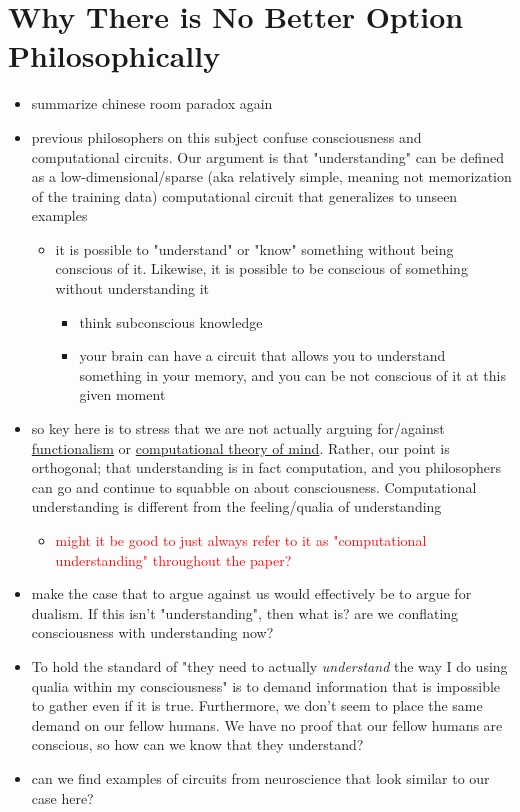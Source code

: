 \documentclass{article}
\begin{document}
\section{Why There is No Better Option Philosophically}
\label{sec:phil}

\begin{itemize}
    \item summarize chinese room paradox again
    \item previous philosophers on this subject confuse consciousness and computational circuits. Our argument is that "understanding" can be defined as a low-dimensional/sparse (aka relatively simple, meaning not memorization of the training data) computational circuit that generalizes to unseen examples
    \begin{itemize}
        \item it is possible to "understand" or "know" something without being conscious of it. Likewise, it is possible to be conscious of something without understanding it
        \begin{itemize}
            \item think subconscious knowledge
            \item your brain can have a circuit that allows you to understand something in your memory, and you can be not conscious of it at this given moment
        \end{itemize}
    \end{itemize}
    \item so key here is to stress that we are not actually arguing for/against \href{https://en.wikipedia.org/wiki/Functionalism_(philosophy_of_mind)}{functionalism} or \href{https://en.wikipedia.org/wiki/Computational_theory_of_mind}{computational theory of mind}. Rather, our point is orthogonal; that understanding is in fact computation, and you philosophers can go and continue to squabble on about consciousness. Computational understanding is different from the feeling/qualia of understanding
    \begin{itemize}
        \item \textcolor{red}{might it be good to just always refer to it as "computational understanding" throughout the paper?}
    \end{itemize}
    \item make the case that to argue against us would effectively be to argue for dualism. If this isn't "understanding", then what is? are we conflating consciousness with understanding now?
    \item To hold the standard of "they need to actually \textit{understand} the way I do using qualia within my consciousness" is to demand information that is impossible to gather even if it is true. Furthermore, we don't seem to place the same demand on our fellow humans. We have no proof that our fellow humans are conscious, so how can we know that they understand?
    \item can we find examples of circuits from neuroscience that look similar to our case here?
\end{itemize}
\end{document}
